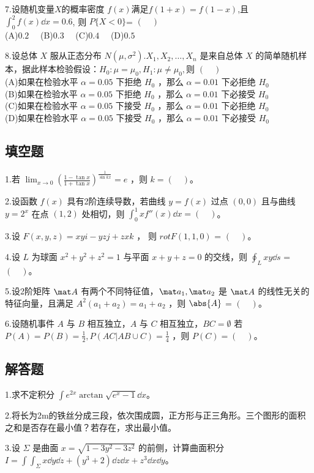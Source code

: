 7.设随机变量$X$的概率密度 $f(x)$满足$f(1+x)=f(1-x)$,且 $\int_0^2 f(x)\dd{x}=0.6$, 则 $P\{X<0\}$= $(\quad)$\\
(A)$0.2 \quad$
(B)$0.3 \quad$
(C)$0.4 \quad$
(D)$0.5 \quad$


8.设总体 $X$ 服从正态分布 $N(\mu,\sigma^2).X_1,X_2,\dots,X_n$ 是来自总体 $X$ 的简单随机样本，据此样本检验假设：$H_0:\mu=\mu_0,H_1:\mu\neq \mu_0,$则 $(\quad)$\\
(A)如果在检验水平 $\alpha=0.05$ 下拒绝 $H_0$ ，那么 $\alpha=0.01$ 下必拒绝 $H_0$\\
(B)如果在检验水平 $\alpha=0.05$ 下拒绝 $H_0$ ，那么 $\alpha=0.01$ 下必接受 $H_0$\\
(C)如果在检验水平 $\alpha=0.05$ 下接受 $H_0$ ，那么 $\alpha=0.01$ 下必拒绝 $H_0$\\
(D)如果在检验水平 $\alpha=0.05$ 下接受 $H_0$ ，那么 $\alpha=0.01$ 下必接受 $H_0$

\subsection{填空题}
1.若 $\displaystyle \lim_{x \to  0} (\frac{1-\tan x}{1+\tan x})^\frac{1}{\sin kx}=e$ ，则 $k=(\quad)$。

2.设函数 $f(x)$ 具有2阶连续导数，若曲线 $y=f(x)$ 过点 $(0,0)$ 且与曲线 $y=2^x$ 在点 $(1,2)$ 处相切，则 $\int_0^1 xf''(x) \dd{x}= (\quad)$。

3.设 $F(x,y,z)=xyi-yzj+zxk$ ， 则 $rot  F(1,1,0)$ = $(\quad)$。

4.设 $L$ 为球面 $x^2+y^2+z^2=1$ 与平面 $x+y+z=0$ 的交线，则 $\oint_L xy\dd{s}$ = $(\quad)$。

5.设2阶矩阵 $\mat A$ 有两个不同特征值，$\mat a_1,\mat a_2$  是 $\mat A$ 的线性无关的特征向量，且满足 $A^2(a_1+a_2)=a_1+a_2$ ，则 $\abs{A}$ = $(\quad)$。

6.设随机事件 $A$ 与 $B$ 相互独立，$A$ 与 $C$ 相互独立，$BC=\emptyset$ 若 $P(A)=P(B)=\frac{1}{2},P(AC|AB \cup C)=\frac{1}{4}$ ，则 $P(C)= (\quad)$。

\subsection{解答题}
1.求不定积分 $\displaystyle \int e^{2x}\arctan \sqrt{e^x-1}\dd{x}$。

2.将长为2m的铁丝分成三段，依次围成圆，正方形与正三角形。三个图形的面积之和是否存在最小值？若存在，求出最小值。

3.设 $\Sigma$ 是曲面 $x=\sqrt{1-3y^2-3z^2}$ 的前侧，计算曲面积分 $\displaystyle I=\int\int_\Sigma x\dd{y}\dd{z}+(y^3+2)\dd{z}\dd{x}+z^3 \dd{x}\dd{y}$。

